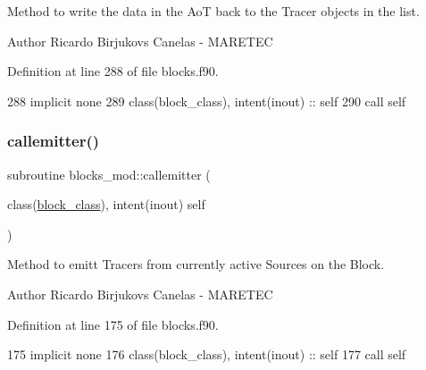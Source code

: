 Method to write the data in the AoT back to the Tracer objects in the list. 

\begin{DoxyAuthor}{Author}
Ricardo Birjukovs Canelas -\/ M\+A\+R\+E\+T\+EC 
\end{DoxyAuthor}


Definition at line 288 of file blocks.\+f90.


\begin{DoxyCode}
288     \textcolor{keywordtype}{implicit none}
289     \textcolor{keywordtype}{class}(block\_class), \textcolor{keywordtype}{intent(inout)} :: self
290     \textcolor{keyword}{call }self%
\end{DoxyCode}
\mbox{\label{namespaceblocks__mod_a2c3cf5113e1422d812c2c869afde2729}} 
\subsubsection{\texorpdfstring{callemitter()}{callemitter()}}
{\footnotesize\ttfamily subroutine blocks\+\_\+mod\+::callemitter (\begin{DoxyParamCaption}\item[{class(\mbox{\hyperlink{structblocks__mod_1_1block__class}{block\+\_\+class}}), intent(inout)}]{self }\end{DoxyParamCaption})\hspace{0.3cm}{\ttfamily [private]}}



Method to emitt Tracers from currently active Sources on the Block. 

\begin{DoxyAuthor}{Author}
Ricardo Birjukovs Canelas -\/ M\+A\+R\+E\+T\+EC 
\end{DoxyAuthor}


Definition at line 175 of file blocks.\+f90.


\begin{DoxyCode}
175     \textcolor{keywordtype}{implicit none}
176     \textcolor{keywordtype}{class}(block\_class), \textcolor{keywordtype}{intent(inout)} :: self
177     \textcolor{keyword}{call }self%
\end{DoxyCode}
\mbox{\label{namespaceblocks__mod_a6cc313e046daa2720cbca810d083faa0}} 
